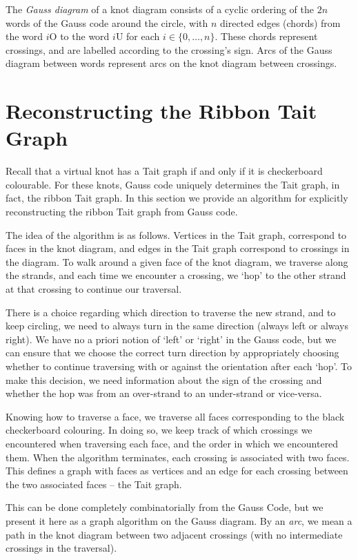 \documentclass[12pt]{report}
\renewcommand{\over}{\text{O}}
\newcommand{\under}{\text{U}}
\theoremstyle{upright}
\begin{document}
The \textit{Gauss diagram} of a knot diagram consists of a cyclic ordering of the $2n$ words of the Gauss code around the circle, with $n$ directed edges (chords) from the word $i\over$ to the word $i\under$ for each $i \in \{0, \dots, n\}$. These chords represent crossings, and are labelled according to the crossing's sign. Arcs of the Gauss diagram between words represent arcs on the knot diagram between crossings.

\section{Reconstructing the Ribbon Tait Graph}

Recall that a virtual knot has a Tait graph if and only if it is checkerboard colourable. For these knots, Gauss code uniquely determines the Tait graph, in fact, the ribbon Tait graph. In this section we provide an algorithm for explicitly reconstructing the ribbon Tait graph from Gauss code.
	
The idea of the algorithm is as follows. Vertices in the Tait graph, correspond to faces in the knot diagram, and edges in the Tait graph correspond to crossings in the diagram. To walk around a given face of the knot diagram, we traverse along the strands, and each time we encounter a crossing, we `hop' to the other strand at that crossing to continue our traversal.

There is a choice regarding which direction to traverse the new strand, and to keep circling, we need to always turn in the same direction (always left or always right). We have no a priori notion of `left' or `right' in the Gauss code, but we can ensure that we choose the correct turn direction by appropriately choosing whether to continue traversing with or against the orientation after each `hop'. To make this decision, we need information about the sign of the crossing and whether the hop was from an over-strand to an under-strand or vice-versa.

Knowing how to traverse a face, we traverse all faces corresponding to the black checkerboard colouring. In doing so, we keep track of which crossings we encountered when traversing each face, and the order in which we encountered them. When the algorithm terminates, each crossing is associated with two faces. This defines a graph with faces as vertices and an edge for each crossing between the two associated faces -- the Tait graph.

This can be done completely combinatorially from the Gauss Code, but we present it here as a graph algorithm on the Gauss diagram. By an \textit{arc}, we mean a path in the knot diagram between two adjacent crossings (with no intermediate crossings in the traversal).
\end{document}
